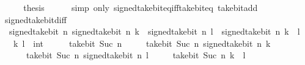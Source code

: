 \begin{isabellebody}
\ \ \isamarkupfalse%
\ \isamarkupfalse%
\ {\isacharquery}{\kern0pt}thesis\isanewline
\ \ \ \ \isamarkupfalse%
\ {\isacharparenleft}{\kern0pt}simp\ only{\isacharcolon}{\kern0pt}\ signed{\isacharunderscore}{\kern0pt}take{\isacharunderscore}{\kern0pt}bit{\isacharunderscore}{\kern0pt}eq{\isacharunderscore}{\kern0pt}iff{\isacharunderscore}{\kern0pt}take{\isacharunderscore}{\kern0pt}bit{\isacharunderscore}{\kern0pt}eq\ take{\isacharunderscore}{\kern0pt}bit{\isacharunderscore}{\kern0pt}add{\isacharparenright}{\kern0pt}\isanewline
{}\isamarkupfalse%
%
\endisatagproof
{\isafoldproof}%
%
\isadelimproof
\isanewline
%
\endisadelimproof
\isanewline
{}\isamarkupfalse%
\ signed{\isacharunderscore}{\kern0pt}take{\isacharunderscore}{\kern0pt}bit{\isacharunderscore}{\kern0pt}diff{\isacharcolon}{\kern0pt}\isanewline
\ \ {\isacartoucheopen}signed{\isacharunderscore}{\kern0pt}take{\isacharunderscore}{\kern0pt}bit\ n\ {\isacharparenleft}{\kern0pt}signed{\isacharunderscore}{\kern0pt}take{\isacharunderscore}{\kern0pt}bit\ n\ k\ {\isacharminus}{\kern0pt}\ signed{\isacharunderscore}{\kern0pt}take{\isacharunderscore}{\kern0pt}bit\ n\ l{\isacharparenright}{\kern0pt}\ {\isacharequal}{\kern0pt}\ signed{\isacharunderscore}{\kern0pt}take{\isacharunderscore}{\kern0pt}bit\ n\ {\isacharparenleft}{\kern0pt}k\ {\isacharminus}{\kern0pt}\ l{\isacharparenright}{\kern0pt}{\isacartoucheclose}\isanewline
\ \ \ k\ l\ {\isacharcolon}{\kern0pt}{\isacharcolon}{\kern0pt}\ int\isanewline
%
\isadelimproof
%
\endisadelimproof
%
\isatagproof
{}\isamarkupfalse%
\ {\isacharminus}{\kern0pt}\isanewline
\ \ \isamarkupfalse%
\ {\isacartoucheopen}take{\isacharunderscore}{\kern0pt}bit\ {\isacharparenleft}{\kern0pt}Suc\ n{\isacharparenright}{\kern0pt}\isanewline
\ \ \ \ \ {\isacharparenleft}{\kern0pt}take{\isacharunderscore}{\kern0pt}bit\ {\isacharparenleft}{\kern0pt}Suc\ n{\isacharparenright}{\kern0pt}\ {\isacharparenleft}{\kern0pt}signed{\isacharunderscore}{\kern0pt}take{\isacharunderscore}{\kern0pt}bit\ n\ k{\isacharparenright}{\kern0pt}\ {\isacharminus}{\kern0pt}\isanewline
\ \ \ \ \ \ take{\isacharunderscore}{\kern0pt}bit\ {\isacharparenleft}{\kern0pt}Suc\ n{\isacharparenright}{\kern0pt}\ {\isacharparenleft}{\kern0pt}signed{\isacharunderscore}{\kern0pt}take{\isacharunderscore}{\kern0pt}bit\ n\ l{\isacharparenright}{\kern0pt}{\isacharparenright}{\kern0pt}\ {\isacharequal}{\kern0pt}\isanewline
\ \ \ \ take{\isacharunderscore}{\kern0pt}bit\ {\isacharparenleft}{\kern0pt}Suc\ n{\isacharparenright}{\kern0pt}\ {\isacharparenleft}{\kern0pt}k\ {\isacharminus}{\kern0pt}\ l{\isacharparenright}{\kern0pt}{\isacartoucheclose}\isanewline

\end{isabellebody}
